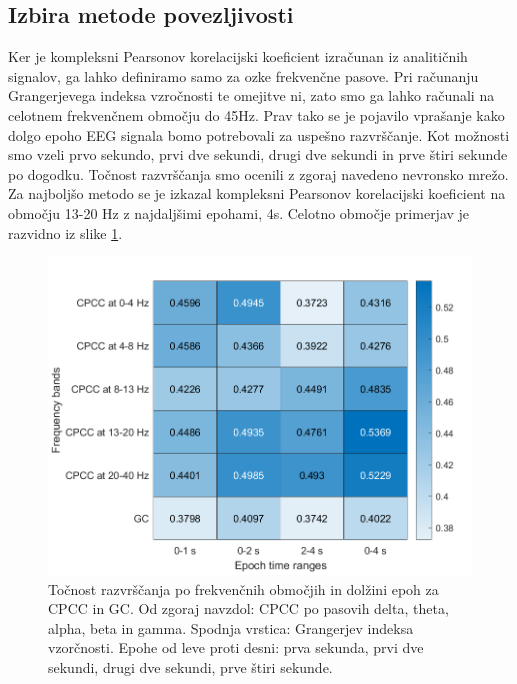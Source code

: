 \subsection{Izbira metode povezljivosti}
Ker je kompleksni Pearsonov korelacijski koeficient izračunan iz analitičnih signalov, ga lahko definiramo samo za ozke frekvenčne pasove. Pri računanju Grangerjevega indeksa vzročnosti te omejitve ni, zato smo ga lahko računali na celotnem frekvenčnem območju do 45Hz. Prav tako se je pojavilo vprašanje kako dolgo epoho EEG signala bomo potrebovali za uspešno razvrščanje. Kot možnosti smo vzeli prvo sekundo, prvi dve sekundi, drugi dve sekundi in prve štiri sekunde po dogodku. Točnost razvrščanja smo ocenili z zgoraj navedeno nevronsko mrežo. Za najboljšo metodo se je izkazal kompleksni Pearsonov korelacijski koeficient na območju 13-20 Hz z najdaljšimi epohami, 4s. Celotno območje primerjav je razvidno iz slike \ref{slika:primerjava_obmocij}.
\begin{figure}
    \begin{center}
    \includegraphics[width=1\linewidth]{slike/Comparison.png}
    \end{center}
    \caption[Točnost razvrščanja po frekvenčnih območjih in dolžini epoh.]{Točnost razvrščanja po frekvenčnih območjih in dolžini epoh za CPCC in GC. Od zgoraj navzdol: CPCC po pasovih delta, theta, alpha, beta in gamma. Spodnja vrstica: Grangerjev indeksa vzorčnosti. Epohe od leve proti desni: prva sekunda, prvi dve sekundi, drugi dve sekundi, prve štiri sekunde.}
    \label{slika:primerjava_obmocij}
\end{figure}

